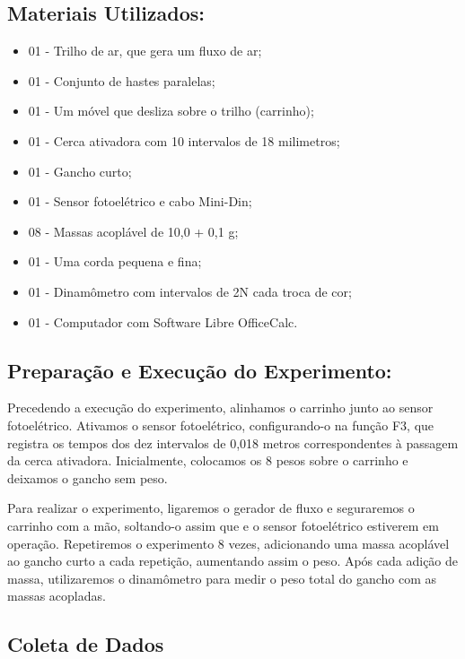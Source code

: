 \documentclass[article,12pt,oneside,a4paper,brazil]{abntex2}
\begin{document}
	\subsection{Materiais Utilizados:}
	\begin{adjustwidth}{1cm}{0cm}
		\begin{itemize}
			\item 01 - Trilho de ar, que gera um fluxo de ar;
			\item 01 - Conjunto de hastes paralelas;
			\item 01 - Um móvel que desliza sobre o trilho (carrinho);
			\item 01 - Cerca ativadora com 10 intervalos de 18 milimetros;
			\item 01 - Gancho curto;
			\item 01 - Sensor fotoelétrico e cabo Mini-Din;
			\item 08 - Massas acoplável de 10,0 + 0,1 g;
			\item 01 - Uma corda pequena e fina;
			\item 01 - Dinamômetro com intervalos de 2N cada troca de cor;	
			\item 01 - Computador com Software Libre OfficeCalc.
	\end{itemize}
	\end{adjustwidth}

	\subsection{Preparação e Execução do Experimento:}
	
	Precedendo a execução do experimento, alinhamos o carrinho junto ao sensor
	fotoelétrico. Ativamos o sensor fotoelétrico, configurando-o na função F3, que registra os tempos dos dez intervalos de 0,018 metros correspondentes à passagem da cerca ativadora. Inicialmente, colocamos os 8 pesos sobre o carrinho e deixamos o gancho sem peso.
	
	Para realizar o experimento, ligaremos o gerador de fluxo e seguraremos o carrinho com a mão, soltando-o assim que e o sensor fotoelétrico estiverem em operação. Repetiremos o experimento 8 vezes, adicionando uma massa acoplável ao gancho curto a cada repetição, aumentando assim o peso. Após cada adição de massa, utilizaremos o dinamômetro para medir o peso total do gancho com as massas acopladas.
		
	\subsection{Coleta de Dados}
	
\end{document}
